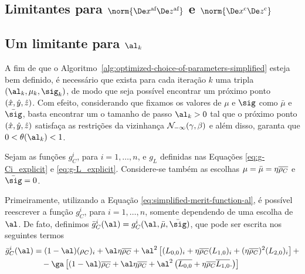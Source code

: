 

\subsection{Limitantes para \texorpdfstring{$\norm{\dex\dez}$ e $\norm{\Decox\Decoz}$}{normas das direções} }


\subsection{Um limitante para \texorpdfstring{$\al_k$}{tamanho do passo} }



A fim de que o Algoritmo~\ref{alg:optimized-choice-of-parameters-simplified} esteja bem definido, é necessário que exista para cada iteração $k$ uma tripla $(\al_k,\mu_k,\sig_k)$, de modo que seja possível encontrar um próximo ponto $(\hat{x},\hat{y},\hat{z})$. Com efeito, considerando que fixamos os valores de $\mu$ e $\sig$ como $\bar{\mu} $ e  $\bar{\sig}$, basta encontrar um o tamanho de passo ${\al_k}>0$ tal que o próximo ponto $(\hat{x},\hat{y},\hat{z})$ satisfaça as restrições da vizinhança 
$\mathcal{N}_{-\infty}(\gamma,\beta)$ e além disso, garanta que  $0 < \theta(\al_k) <1$. 

Sejam as funções  $g_C^i$, para $i=1,\ldots,n$, e $g_L$ definidas nas Equações  \eqref{eq:g-Ci_explicit} e 
\eqref{eq:g-L_explicit}.  Considere-se também  as escolhas $\mu = \bar{\mu} = \eta\overline{\rho_C} $ e $\bar{\sig}=0$.

 Primeiramente, utilizando a Equação \eqref{eq:simplified-merit-function-al}, é possível reescrever a função $g_C^i $, para $i=1,\ldots,n$,  somente dependendo de uma escolha de $\al$. De fato, definimos $\bar{g}_C^i(\al) = g_C^i(\al,\bar{\mu},\bar{\sig})$, que pode ser escrita nos seguintes termos 
\[
\begin{aligned}
	\bar{g}_C^i (\al)				& = (1-\al)(\rho_C)_i+ \al\eta\dbvec{\rho_C}+ \al^2\left[(L_{0,0})_i + \eta\dbvec{\rho_C} ({L_{1,0}})_i 
				+ (\eta\dbvec{\rho_C})^2(L_{2,0})_i \right]  + \\
				& \quad -\ga\left[  (1-\al)\dbvec{\rho_C} + \al\eta\dbvec{\rho_C} + \al^2\left(\dbvec{L_{0,0}} + \eta\dbvec{\rho_C} \dbvec{L_{1,0}}.
\right)  \right]
\end{aligned}
\]

